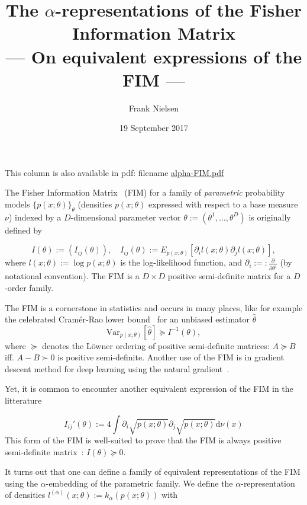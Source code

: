 \documentclass[11pt]{article}
\title{The $\alpha$-representations of the Fisher Information Matrix\\ --- On equivalent expressions of the FIM ---}
\date{19 September 2017}
\author{Frank Nielsen}
\def\eqdef{:=}
\def\eqnota{:=:}
\def\dnu{\mathrm{d}\nu}
\def\Var{\mathrm{Var}}
\begin{document}
\maketitle


This column is also available in pdf: filename \url{alpha-FIM.pdf} 
\vskip 0.5cm

The Fisher Information Matrix~\cite{IG-2014} (FIM) for a family of {\em parametric} probability models $\{p(x;\theta)\}_\theta$ 
(densities $p(x;\theta)$ expressed with respect to a base measure $\nu$) indexed by
 a $D$-dimensional parameter vector $\theta\eqdef(\theta^1,\ldots,\theta^D)$  is originally defined by

\begin{equation}\label{eq:FIM1}
I(\theta) \eqdef (I_{ij}(\theta)),
\quad I_{ij}(\theta) \eqdef E_{p(x;\theta)}[\partial_i l(x;\theta)\partial_j l(x;\theta)],
\end{equation}
where $l(x;\theta)\eqdef\log p(x;\theta)$ is the log-likelihood function, and 
$\partial_i \eqnota \frac{\partial}{\partial\theta^i}$ (by notational convention).
The FIM is a $D\times D$ positive semi-definite matrix for a $D$-order family.

The FIM  is a cornerstone in statistics and occurs in many places, like for example the celebrated
 Cram\'er-Rao lower bound~\cite{CR-2013} for an unbiased estimator $\hat\theta$
$$
\Var_{p(x;\theta)}[\hat{\theta}]\succeq I^{-1}(\theta),
$$
where $\succeq$ denotes the L\"owner ordering of positive semi-definite matrices: 
$A\succeq B$  iff. $A-B\succ 0$ is  positive semi-definite.
Another use of the FIM is in gradient descent method for deep learning using the natural gradient~\cite{RFIM-2017}.

Yet, it is common to encounter  another equivalent expression of the FIM in the litterature~\cite{CR-2013,IG-2014}

\begin{equation}\label{eq:FIM0}
I_{ij}'(\theta) \eqdef 4\int \partial_i\sqrt{p(x;\theta)}\partial_j\sqrt{p(x;\theta)}\dnu(x)
\end{equation}
This form of the FIM is well-suited to prove that the FIM is always positive semi-definite matrix~\cite{IG-2014}: $I(\theta)\succeq 0$.



It turns out that one can define a family of equivalent representations of the FIM using the $\alpha$-embedding of the parametric family.
We define the $\alpha$-representation of densities $l^{(\alpha)}(x;\theta):=k_\alpha(p(x;\theta))$ with
\end{document}
